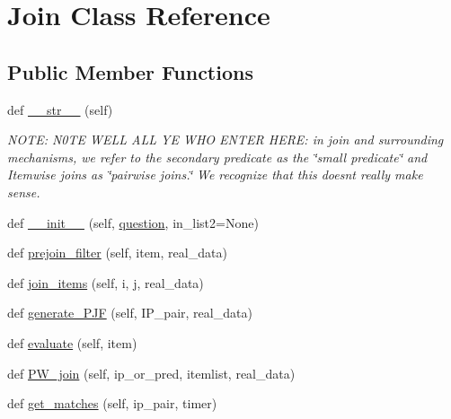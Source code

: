 \hypertarget{classdynamicfilterapp_1_1models_1_1_join}{}\section{Join Class Reference}
\label{classdynamicfilterapp_1_1models_1_1_join}
\subsection*{Public Member Functions}
\begin{DoxyCompactItemize}
\item 
def \hyperlink{classdynamicfilterapp_1_1models_1_1_join_a23e8041ce1015febe4fdace3225714f9}{\+\_\+\+\_\+str\+\_\+\+\_\+} (self)
\begin{DoxyCompactList}\small\item\em N\+O\+TE\+: N0\+TE W\+E\+LL A\+LL YE W\+HO E\+N\+T\+ER H\+E\+RE\+: in join and surrounding mechanisms, we refer to the secondary predicate as the \char`\"{}small predicate\char`\"{} and Itemwise joins as \char`\"{}pairwise joins.\char`\"{} We recognize that this doesn\textquotesingle{}t really make sense. \end{DoxyCompactList}\item 
def \hyperlink{classdynamicfilterapp_1_1models_1_1_join_a7564097a16dcabdffeaa80d067a31af1}{\+\_\+\+\_\+init\+\_\+\+\_\+} (self, \hyperlink{classdynamicfilterapp_1_1models_1_1_join_a1a1b6bd27a93f9139a2f44d01f7b3ad1}{question}, in\+\_\+list2=None)
\item 
def \hyperlink{classdynamicfilterapp_1_1models_1_1_join_ad1f0a62df23661b1591a26c02bd59664}{prejoin\+\_\+filter} (self, item, real\+\_\+data)
\item 
def \hyperlink{classdynamicfilterapp_1_1models_1_1_join_af917b6ab7796d7f1e90cb6a45b164120}{join\+\_\+items} (self, i, j, real\+\_\+data)
\item 
def \hyperlink{classdynamicfilterapp_1_1models_1_1_join_a5392742a9380d1854a4857c33423aaf8}{generate\+\_\+\+P\+JF} (self, I\+P\+\_\+pair, real\+\_\+data)
\item 
def \hyperlink{classdynamicfilterapp_1_1models_1_1_join_aced24bb06eb985f2929181e535212ffb}{evaluate} (self, item)
\item 
def \hyperlink{classdynamicfilterapp_1_1models_1_1_join_ade68171b323e0e7d3888f35cfbfa704e}{P\+W\+\_\+join} (self, ip\+\_\+or\+\_\+pred, itemlist, real\+\_\+data)
\item 
def \hyperlink{classdynamicfilterapp_1_1models_1_1_join_a22edc19c031e9b7b51a7c9eab7ba81c1}{get\+\_\+matches} (self, ip\+\_\+pair, timer)

\end{DoxyCompactItemize}
